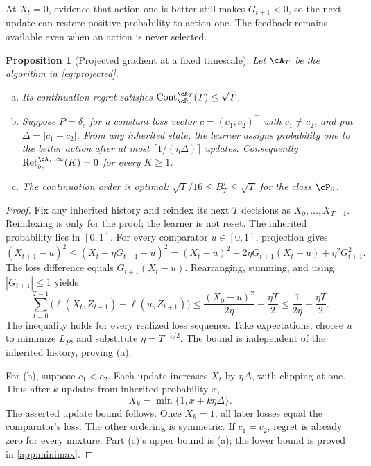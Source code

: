 \documentclass[11pt,twoside]{article}
\newtheorem{proposition}[theorem]{Proposition}
\theoremstyle{definition}
\theoremstyle{remark}
\DeclareMathOperator{\Cont}{Cont}
\DeclareMathOperator{\Ret}{Ret}
\begin{document}
At $X_t=0$, evidence that action one is better still makes $G_{t+1}<0$,
so the next update can restore positive probability to action one.
The feedback remains available even when an action is never selected.

\begin{proposition}[Projected gradient at a fixed timescale]
\label{thm:projected}
Let $\cA_T$ be the algorithm in \cref{eq:projected}.
\begin{enumerate}[(a),leftmargin=*]
\item Its continuation regret satisfies
$\Cont_{\cP_{\rm fi}}^{\cA_T}(T)\le\sqrt T$.
\item Suppose $P=\delta_c$ for a constant loss vector
$c=(c_1,c_2)^\top$ with $c_1\ne c_2$, and put $\Delta=|c_1-c_2|$.
From any inherited state, the learner assigns probability one to the
better action after at most $\lceil1/(\eta\Delta)\rceil$ updates.
Consequently $\Ret_{\delta_c}^{\cA_T,\infty}(K)=0$ for every $K\ge1$.
\item The continuation order is optimal:
$\sqrt T/16\le B_T^\star\le\sqrt T$ for the class $\cP_{\rm fi}$.
\end{enumerate}
\end{proposition}

\begin{proof}
Fix any inherited history and reindex its next $T$ decisions as
$X_0,\ldots,X_{T-1}$. Reindexing is only for the proof; the learner is
not reset. The inherited probability lies in $[0,1]$.
For every comparator $u\in[0,1]$, projection gives
\[
 (X_{t+1}-u)^2
 \le(X_t-\eta G_{t+1}-u)^2
 =(X_t-u)^2-2\eta G_{t+1}(X_t-u)+\eta^2G_{t+1}^2.
\]
The loss difference equals $G_{t+1}(X_t-u)$. Rearranging, summing, and
using $|G_{t+1}|\le1$ yields
\begin{equation}
 \sum_{t=0}^{T-1}\bigl(\ell(X_t,Z_{t+1})-\ell(u,Z_{t+1})\bigr)
 \le\frac{(X_0-u)^2}{2\eta}+\frac{\eta T}{2}
 \le\frac{1}{2\eta}+\frac{\eta T}{2}.
 \label{eq:restart-free-bound}
\end{equation}
The inequality holds for every realized loss sequence. Take expectations,
choose $u$ to minimize $L_P$, and substitute $\eta=T^{-1/2}$.
The bound is independent of the inherited history, proving (a).

For (b), suppose $c_1<c_2$. Each update increases $X_t$ by
$\eta\Delta$, with clipping at one. Thus after $k$ updates from
inherited probability $x$,
\[
 X_k=\min\{1,x+k\eta\Delta\}.
\]
The asserted update bound follows. Once $X_k=1$, all later losses equal
the comparator's loss. The other ordering is symmetric.
If $c_1=c_2$, regret is already zero for every mixture.
Part (c)'s upper bound is (a); the lower bound is proved in
\cref{app:minimax}.
\end{proof}
\end{document}
